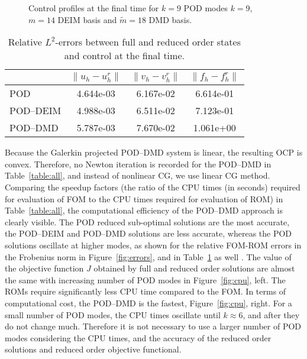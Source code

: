 \documentclass[preprint,12pt]{elsarticle}
\begin{document}
\begin{figure}[htb]
\centering
	
   \caption{Control profiles at the final time for $k=9$ POD modes $k=9$, $m=14$ DEIM basis and $\widetilde{m}=18$ DMD basis.}
   \label{fig:control}
\end{figure}

\begin{table}[htb]
\centering
\begin{tabular}{l|ccc}
  &  $\|u_h-u_h^r\|$  &  $\|v_h-v_h^r\|$ & $\|f_h-f_h^r\|$  \\
\hline
POD       &  4.644e-03  &  6.167e-02  &  6.614e-01   \\
POD--DEIM  &  4.988e-03  &  6.511e-02  &  7.123e-01  \\
POD--DMD   &  5.787e-03  &  7.670e-02  &  1.061e+00  \\
\hline
\end{tabular}
\caption{Relative $L^2$-errors between full and reduced order states and control at the final time.}
\label{table:time}
\end{table}


Because the Galerkin projected POD--DMD system is linear, the resulting OCP is convex. Therefore, no Newton iteration is recorded for the POD--DMD in Table~\ref{table:all}, and instead of nonlinear CG, we use linear CG method. Comparing the speedup factors (the ratio of the CPU times (in seconds) required for evaluation of FOM to the CPU times required for evaluation of ROM) in Table~\ref{table:all}, the computational efficiency of the POD--DMD approach is clearly visible.   The POD reduced sub-optimal solutions are the most accurate, the POD--DEIM and POD--DMD solutions are less accurate, whereas the POD solutions oscillate at higher modes, as shown for the relative FOM-ROM errors in the Frobenius norm in Figure~\ref{fig:errors}, and in Table~\ref{table:time} as well . The value of the objective function $J$ obtained by full and reduced order solutions are almost the same with increasing number of POD modes in Figure~\ref{fig:cpu}, left.
The ROMs require significantly less CPU time compared to the FOM.
In terms of computational cost, the POD--DMD is the fastest, Figure~\ref{fig:cpu}, right. For a small number of POD modes, the CPU times oscillate until $k \approx 6$, and after they do not change much. Therefore it is not necessary to use a larger number of POD modes considering the CPU times, and the accuracy of the reduced order solutions and reduced order objective functional.
\end{document}
